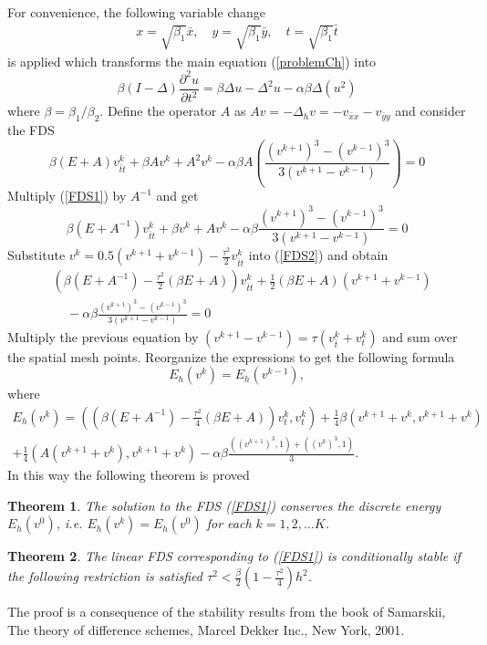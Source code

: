 \documentclass[%
 aip,
cp,  %
 amsmath,amssymb,%
 reprint,%
]{revtex4-2}
\newcommand{\be}{\begin{equation}}
\newcommand{\ee}{\end{equation}}
\newcommand{\rf}[1]{(\ref{#1})}
\newtheorem{thm}{Theorem}
\begin{document}
For convenience, the following variable change 
\begin{align}
x = \sqrt{\beta_1} \bar{x}, \quad y = \sqrt{\beta_1} \bar{y}, \quad t = \sqrt{\beta_1} \bar{t} \nonumber
\end{align}
is applied which transforms the main equation \rf{problemCh} into
\be\label{problemVC}
\beta(I-\Delta) \frac{\partial^2 u}{\partial t^2}= \beta \Delta u -\Delta^2 u -\alpha \beta \Delta (u^2)
\ee
where $\beta = \beta_1/\beta_2$. Define the operator $A$ as $Av=-\Delta_h v=-v_{\bar{x}x} - v_{\bar{y}y}$ and consider the FDS
\be\label{FDS1}
\beta (E+A)v_{\bar{t}t}^k +\beta Av^k+A^2 v^k -\alpha \beta A\left(\frac{(v^{k+1})^3-(v^{k-1})^3}{3(v^{k+1}-v^{k-1})} \right)=0
\ee
Multiply \rf{FDS1} by $A^{-1}$ and get 
\be\label{FDS2}
\beta (E+A^{-1})v_{\bar{t}t}^k +\beta v^k+A v^k -\alpha \beta \frac{(v^{k+1})^3-(v^{k-1})^3}{3(v^{k+1}-v^{k-1})} =0
\ee
Substitute $v^{k}=0.5(v^{k+1}+v^{k-1})-\frac{\tau^2}{2}v_{\bar{t}t}^k$ into \rf{FDS2}
and obtain
\begin{align*}
&\left( \beta (E+A^{-1})- \frac{\tau^2}{2}(\beta E+A ) \right)v_{\bar{t}t}^k  + \frac{1}{2} (\beta E +A )(v^{k+1}+v^{k-1}) \\
&~~~~~-\alpha \beta \frac{(v^{k+1})^3-(v^{k-1})^3}{3(v^{k+1}-v^{k-1})} =0
\end{align*}
Multiply the previous equation by $(v^{k+1}-v^{k-1})=\tau (v_{\bar{t}}^k + v_{t}^k)$ and sum over the spatial mesh points.
Reorganize the expressions to get the following formula 
\be \label{num_en}
E_h(v^k) =E_h(v^{k-1}),
\ee
where
\begin{align*}
E_h(v^k)=\left( \left( \beta (E+A^{-1})- \frac{\tau^2}{4}(\beta E+A ) \right)v_{t}^k ,v_{t}^k \right)+\frac{1}{4} \beta \left(  v^{k+1}+v^{k}, v^{k+1}+v^{k} \right) \\
+\frac{1}{4}  \left(  A(v^{k+1}+v^{k}), v^{k+1}+v^{k} \right)
-\alpha \beta \frac{((v^{k+1})^3,1)+((v^{k})^3,1)}{3}.
\end{align*}
In this way the following theorem is proved
\begin{thm}
The solution to the FDS \rf{FDS1} conserves the discrete energy
 $E_h(v^0)$, i.e.  $E_h(v^k) =E_h(v^{0})$ for each $k=1,2,...K$.
\end{thm}

\begin{thm}
The linear FDS corresponding to \rf{FDS1} is conditionally stable if
the following restriction is satisfied
$\tau^2 < \frac{\beta}{2}(1-\frac{\tau^2}{4}) h^2$.

\end{thm}
The proof is a consequence of the stability results from the book of
 Samarskii,  The theory of difference schemes, Marcel Dekker Inc., New York, 2001.
\end{document}
